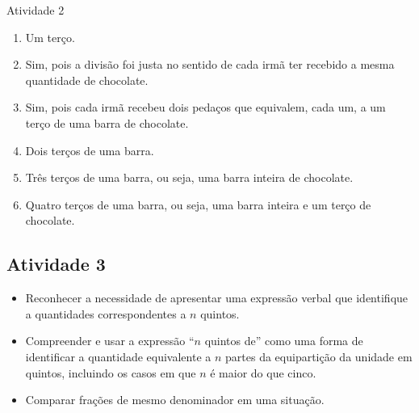 \begin{multicols}{2}
\begin{resposta*}{Atividade 2}
\begin{enumerate} [\quad a)] %
    \item  Um terço.
    \item  Sim, pois a divisão foi justa no sentido de cada irmã ter recebido a mesma quantidade de chocolate.
    \item  Sim, pois cada irmã recebeu dois pedaços que equivalem, cada um, a um terço de uma barra de chocolate.
    \item  Dois terços de uma barra.
    \item  Três terços de uma barra, ou seja, uma barra inteira de chocolate.
    \item  Quatro terços de uma barra, ou seja, uma barra inteira e um terço de chocolate.
\end{enumerate} %

\end{resposta*}

\newpage
\subsection{Atividade 3}

   \vspace{.1cm}

  \begin{itemize} %
\item Reconhecer a necessidade de apresentar uma expressão verbal que identifique a quantidades correspondentes a $n$ quintos.
\item Compreender e usar a expressão ``$n$ quintos de'' como uma forma de identificar a quantidade equivalente a $n$ partes da equipartição da unidade em quintos, incluindo os casos em que $n$ é maior do que cinco.
\item Comparar frações de mesmo denominador em uma situação.
\end{itemize} %


  \vspace{.1cm}

  \vspace{.1cm}


\end{multicols}
